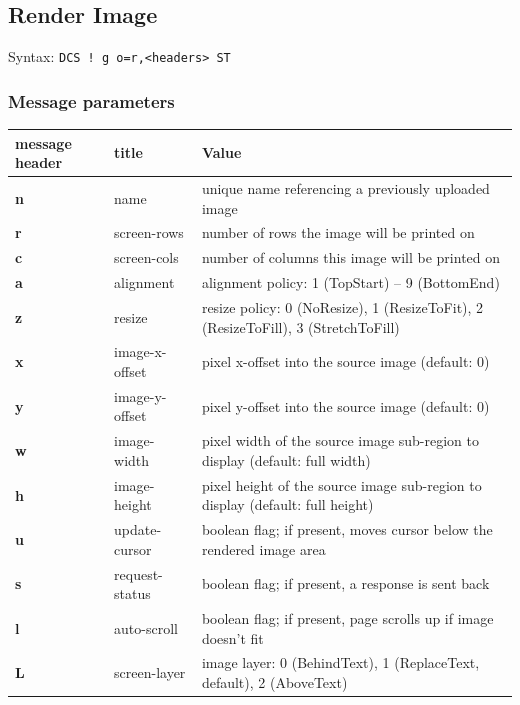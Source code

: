\documentclass[a4paper]{article}
\newcommand{\code}[1]{\colorbox{light-gray}{\texttt{#1}}}
\begin{document}
\pagebreak

\subsection{Render Image} %

Syntax: \code{DCS ! g o=r,<headers> ST}

\subsubsection*{Message parameters}

\begin{tabular}{|m{3cm}|m{2cm}|m{11cm}|}
    \hline
    \textbf{message header}   & \textbf{title}   & \textbf{Value} \\
    \hline
    \textbf{n} & name             & unique name referencing a previously uploaded image \\
    \textbf{r} & screen-rows      & number of rows the image will be printed on \\
    \textbf{c} & screen-cols      & number of columns this image will be printed on \\
    \textbf{a} & alignment        & alignment policy: 1 (TopStart) -- 9 (BottomEnd) \\
    \textbf{z} & resize           & resize policy: 0 (NoResize), 1 (ResizeToFit), 2 (ResizeToFill), 3 (StretchToFill) \\
    \textbf{x} & image-x-offset   & pixel x-offset into the source image (default: 0) \\
    \textbf{y} & image-y-offset   & pixel y-offset into the source image (default: 0) \\
    \textbf{w} & image-width      & pixel width of the source image sub-region to display (default: full width) \\
    \textbf{h} & image-height     & pixel height of the source image sub-region to display (default: full height) \\
    \textbf{u} & update-cursor    & boolean flag; if present, moves cursor below the rendered image area \\
    \textbf{s} & request-status   & boolean flag; if present, a response is sent back \\
    \textbf{l} & auto-scroll      & boolean flag; if present, page scrolls up if image doesn't fit \\
    \textbf{L} & screen-layer     & image layer: 0 (BehindText), 1 (ReplaceText, default), 2 (AboveText) \\
    \hline
\end{tabular}
\end{document}
